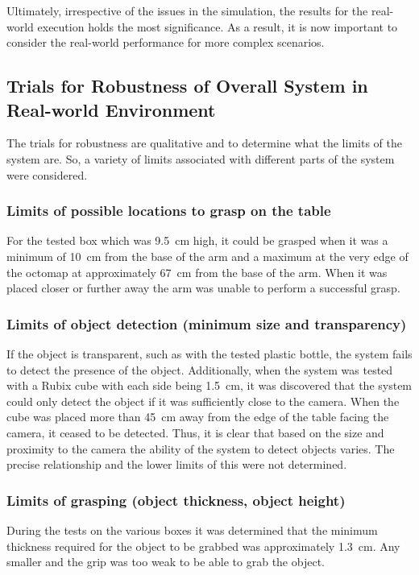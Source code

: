 \documentclass[letterpaper, 10 pt, conference]{conf/ieeeconf}  %
\begin{document}
Ultimately, irrespective of the issues in the simulation, the results for the
real-world execution holds the most significance. As a result, it is now
important to consider the real-world performance for more complex scenarios.

\subsection{Trials for Robustness of Overall System in Real-world Environment}
The trials for robustness are qualitative and to determine what the limits of
the system are. So, a variety of limits associated with different parts of the
system were considered.

\subsubsection{Limits of possible locations to grasp on the table}
For the tested box which was \SI{9.5}{\centi\meter} high, it could be grasped
when it was a minimum of \SI{10}{\centi\meter} from the base of the arm and a
maximum at the very edge of the octomap at approximately \SI{67}{\centi\meter}
from the base of the arm. When it was placed closer or further away the arm was
unable to perform a successful grasp.

\subsubsection{Limits of object detection (minimum size and transparency)}
If the object is transparent, such as with the tested plastic bottle, the system
fails to detect the presence of the object. Additionally, when the system was
tested with a Rubix cube with each side being \SI{1.5}{\centi\meter}, it was
discovered that the system could only detect the object if it was sufficiently
close to the camera. When the cube was placed more than \SI{45}{\centi\meter}
away from the edge of the table facing the camera, it ceased to be detected.
Thus, it is clear that based on the size and proximity to the camera the ability
of the system to detect objects varies. The precise relationship and the lower
limits of this were not determined.

\subsubsection{Limits of grasping (object thickness, object height)}
During the tests on the various boxes it was determined that the minimum
thickness required for the object to be grabbed was approximately
\SI{1.3}{\centi\meter}. Any smaller and the grip was too weak to be able to grab
the object.
\end{document}

